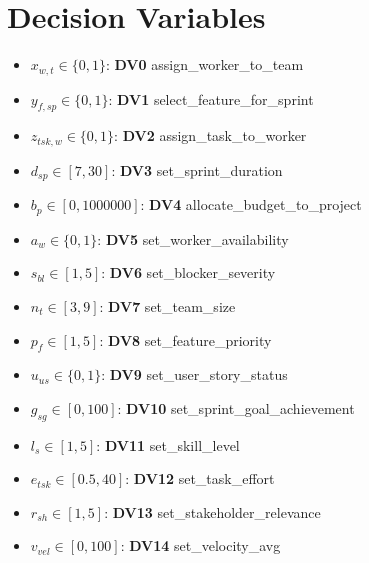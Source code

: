 \documentclass{article}
\begin{document}
\section{Decision Variables}
\begin{itemize}
    \item $x_{w,t} \in \{0,1\}$: \textbf{DV0} assign\_worker\_to\_team
    \item $y_{f,sp} \in \{0,1\}$: \textbf{DV1} select\_feature\_for\_sprint
    \item $z_{tsk,w} \in \{0,1\}$: \textbf{DV2} assign\_task\_to\_worker
    \item $d_{sp} \in [7,30]$: \textbf{DV3} set\_sprint\_duration
    \item $b_p \in [0,1000000]$: \textbf{DV4} allocate\_budget\_to\_project
    \item $a_w \in \{0,1\}$: \textbf{DV5} set\_worker\_availability
    \item $s_{bl} \in [1,5]$: \textbf{DV6} set\_blocker\_severity
    \item $n_t \in [3,9]$: \textbf{DV7} set\_team\_size
    \item $p_f \in [1,5]$: \textbf{DV8} set\_feature\_priority
    \item $u_{us} \in \{0,1\}$: \textbf{DV9} set\_user\_story\_status
    \item $g_{sg} \in [0,100]$: \textbf{DV10} set\_sprint\_goal\_achievement
    \item $l_{s} \in [1,5]$: \textbf{DV11} set\_skill\_level
    \item $e_{tsk} \in [0.5,40]$: \textbf{DV12} set\_task\_effort
    \item $r_{sh} \in [1,5]$: \textbf{DV13} set\_stakeholder\_relevance
    \item $v_{vel} \in [0,100]$: \textbf{DV14} set\_velocity\_avg
\end{itemize}
\end{document}

